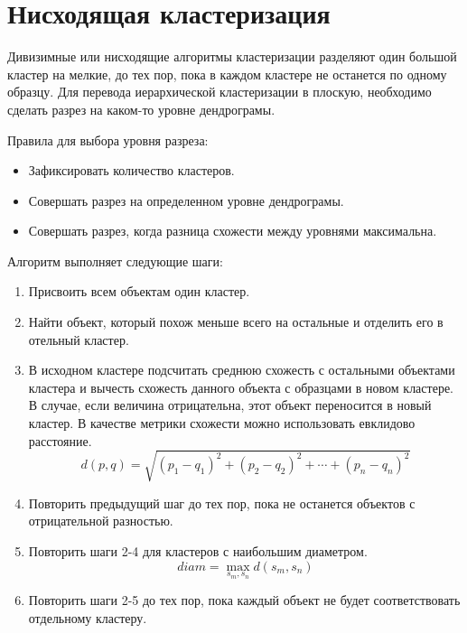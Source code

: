 \documentclass[12pt, a4paper]{article}
\begin{document}
\section*{Нисходящая кластеризация}

Дивизимные или нисходящие алгоритмы кластеризации разделяют один большой кластер на мелкие, до тех пор, пока в каждом кластере не останется по одному образцу. Для перевода иерархической кластеризации в плоскую, необходимо сделать разрез на каком-то уровне дендрограмы. 

Правила для выбора уровня разреза:
\begin{itemize} 
\item Зафиксировать количество кластеров.


\item Совершать разрез на определенном уровне дендрограмы. 


\item Совершать разрез, когда разница схожести между уровнями максимальна. 
\end{itemize}

Алгоритм выполняет следующие шаги:
\begin{enumerate}


\item Присвоить всем объектам один кластер.


\item Найти объект, который похож меньше всего на остальные и отделить его в отельный кластер.


\item В исходном кластере подсчитать среднюю схожесть с остальными объектами кластера и вычесть схожесть данного объекта с образцами в новом кластере. В случае, если величина отрицательна, этот объект переносится в новый кластер. В качестве метрики схожести можно использовать евклидово расстояние.
\[
d(p, q) = \sqrt{(p_1 - q_1)^2 + (p_2 - q_2)^2 + \cdots + (p_n - q_n)^2}
\]

\item Повторить предыдущий шаг до тех пор, пока не останется объектов с отрицательной разностью.



\item Повторить шаги 2-4 для кластеров с наибольшим диаметром.
\[
diam = \max_{s_m, s_n} d(s_m, s_n)
\]
         
         
\item Повторить шаги 2-5 до тех пор, пока каждый объект не будет соответствовать отдельному кластеру.
\end{enumerate}
\end{document}
